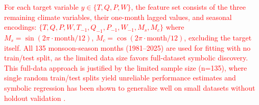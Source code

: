 \documentclass{article}
\begin{document}
\textcolor{red}{
For each target variable \(y \in \{T, Q, P, W\}\), the feature set consists of the three remaining climate variables, their one-month lagged values, and seasonal encodings: \(\{T, Q, P, W, T_{-1}, Q_{-1}, P_{-1}, W_{-1}, M_s, M_c\}\) where \(M_s = \sin(2\pi \cdot \text{month}/12)\), \(M_c = \cos(2\pi \cdot \text{month}/12)\), excluding the target itself. All 135 monsoon-season months (1981--2025) are used for fitting with no train/test split, as the limited data size favors full-dataset symbolic discovery. This full-data approach is justified by the limited sample size (n=135), where single random train/test splits yield unreliable performance estimates \citep{an2021radiomics} and symbolic regression has been shown to generalize well on small datasets without holdout validation \citep{wilstrup2021symbolic}.}
\end{document}
